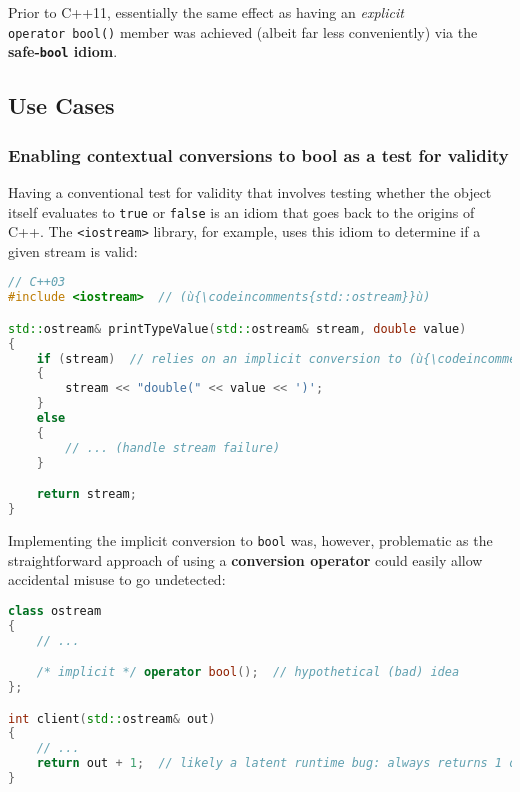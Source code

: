 \noindent Prior to C++11, essentially the same effect as having an \emph{explicit}
\texttt{operator}~\texttt{bool()} member was achieved (albeit far less
conveniently) via the \textbf{safe-\texttt{bool} idiom}.

\subsection[Use Cases]{Use Cases}\label{use-cases-explicitconv}

\subsubsection[Enabling contextual conversions to {\tt bool} as a test for validity]{Enabling contextual conversions to {\SubsubsecCode bool} as a test for validity}\label{enabling-contextual-conversions-to-bool-as-a-test-for-validity}

Having a conventional test for validity that involves testing whether the object itself evaluates to \texttt{true} or \texttt{false} is an idiom that goes back to the
origins of C++. The \texttt{<iostream>} library, for example, uses this
idiom to determine if a given stream is valid:

\begin{lstlisting}[language=C++]
// C++03
#include <iostream>  // (ù{\codeincomments{std::ostream}}ù)

std::ostream& printTypeValue(std::ostream& stream, double value)
{
    if (stream)  // relies on an implicit conversion to (ù{\codeincomments{bool}}ù)
    {
        stream << "double(" << value << ')';
    }
    else
    {
        // ... (handle stream failure)
    }

    return stream;
}
\end{lstlisting}
    
\noindent Implementing the implicit conversion to \texttt{bool} was, however,
problematic as the straight\-forward approach of using a
\textbf{conversion operator} could easily allow accidental misuse to go
undetected:

\begin{lstlisting}[language=C++]
class ostream
{
    // ...

    /* implicit */ operator bool();  // hypothetical (bad) idea
};

int client(std::ostream& out)
{
    // ...
    return out + 1;  // likely a latent runtime bug: always returns 1 or 2
}
\end{lstlisting}
    
